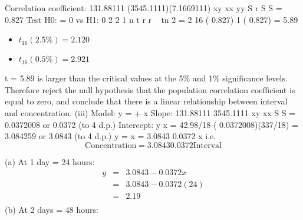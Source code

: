 \documentclass[a4paper,12pt]{article}
\begin{document}
Correlation coefficient:
131.88111
(3545.1111)(7.1669111)
xy
xx yy
S
r
S S
= 0.827
Test H0: = 0 vs H1: 0
2
2
1
n
t r
r
~ tn 2
= 2
16
( 0.827)
1 ( 0.827)
= 5.89
\begin{itemize}
\item $t_{16}(2.5\%) = 2.120$
\item $t_{16}(0.5\%) = 2.921$
\end{itemize}

t = 5.89 is larger than the critical values at the 5\% and 1\% significance levels. Therefore reject the null hypothesis that the population correlation coefficient is equal to zero, and conclude that there is a linear relationship
between interval and concentration.
(iii) Model: y = + x
Slope:
131.88111
3545.1111
xy
xx
S
S
= 0.0372008 or 0.0372 (to 4 d.p.)
Intercept:
y x
= 42.98/18 ( 0.0372008)(337/18)
= 3.084259 or 3.0843 (to 4 d.p.)
y = x
= 3.0843 0.0372 x
i.e. \[\mbox{Concentration} = 3.0843 0.0372 \mbox{Interval}\]


(a) At 1 day = 24 hours:
\begin{eqnarray*}
y &=& 3.0843 -  0.0372 x\\
&=& 3.0843 - 0.0372 (24)\\
&=& 2.19\\
\end{eqnarray*}
(b) At 2 days = 48 hours:
\end{document}
